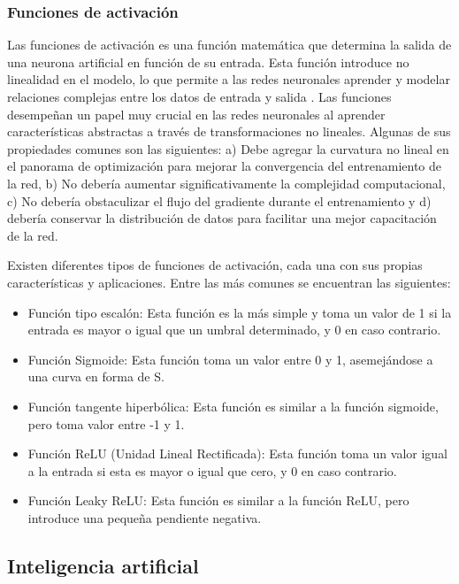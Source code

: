 \subsubsection{Funciones de activación}

Las funciones de activación es una función matemática que determina la salida de una neurona artificial en función de su entrada. Esta función introduce no linealidad en el modelo, lo que permite a las redes neuronales aprender y modelar relaciones complejas entre los datos de entrada y salida \citep{dubey2022activation}. Las funciones desempeñan un papel muy crucial en las redes neuronales al aprender características abstractas a través de transformaciones no lineales. Algunas de sus propiedades comunes son las siguientes: a) Debe agregar la curvatura no lineal en el panorama de optimización para mejorar la convergencia del entrenamiento de la red, b) No debería aumentar significativamente la complejidad computacional, c) No debería obstaculizar el flujo del gradiente durante el entrenamiento y d) debería conservar la distribución de datos para facilitar una mejor capacitación de la red.

Existen diferentes tipos de funciones de activación, cada una con sus propias características y aplicaciones. Entre las más comunes se encuentran las siguientes:

\begin{itemize}
    \item Función tipo escalón: Esta función es la más simple y toma un valor de 1 si la entrada es mayor o igual que un umbral determinado, y 0 en caso contrario.
    \item Función Sigmoide: Esta función toma un valor entre 0 y 1, asemejándose a una curva en forma de S.
    \item Función tangente hiperbólica: Esta función es similar a la función sigmoide, pero toma valor entre -1 y 1.
    \item Función ReLU (Unidad Lineal Rectificada): Esta función toma un valor igual a la entrada si esta es mayor o igual que cero, y 0 en caso contrario.
    \item Función Leaky ReLU: Esta función es similar a la función ReLU, pero introduce una pequeña pendiente negativa.
\end{itemize}

\subsection{Inteligencia artificial}

